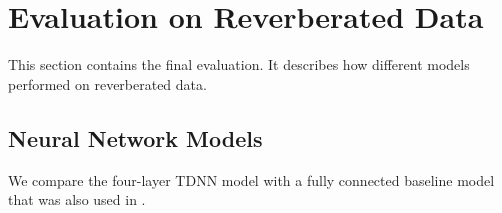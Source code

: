 
\chapter{Evaluation on Reverberated Data}
\label{ch:results}
This section contains the final evaluation. It describes how different models performed on reverberated data.
\section{Neural Network Models}
We compare the four-layer TDNN model with a fully connected baseline model that was also used in \cite{nguyen20162016}. \\ \\

